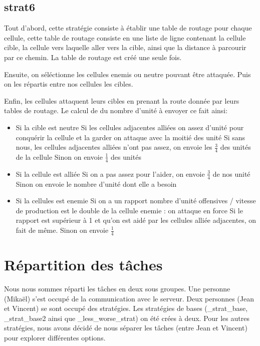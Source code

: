 \documentclass{rapport}
\begin{document}
		\section{strat6}
			Tout d'abord, cette stratégie consiste à établir une table de routage pour chaque cellule, cette table de routage consiste en une liste de ligne contenant la cellule cible, la cellule vers laquelle aller vers la cible, ainsi que la distance à parcourir par ce chemin. La table de routage est créé une seule fois.

			Ensuite, on séléctionne les cellules enemis ou neutre pouvant être attaquée. Puis on les répartis entre nos cellules les cibles.

			Enfin, les cellules attaquent leurs cibles en prenant la route donnée par leurs tables de routage.
			Le calcul de du nombre d'unité à envoyer ce fait ainsi:
			\begin{itemize}
					\item Si la cible est neutre
						\subitem Si les cellules adjacentes alliées on assez d'unité pour conquérir la cellule et la garder on attaque avec la moitié des unité
						\subitem Si sans nous, les cellules adjacentes alliées n'ont pas assez, on envoie les $\frac{3}{4}$ des unités de la cellule
						\subitem Sinon on envoie $\frac{1}{4}$ des unités
					\item Si la cellule est alliée
						\subitem Si on a pas assez pour l'aider, on envoie $\frac{3}{4}$ de nos unité
						\subitem Sinon on envoie le nombre d'unité dont elle a besoin
					\item Si la cellules est enemie
						\subitem Si on a un rapport nombre d'unité offensives / vitesse de production est le double de la cellule enemie : on attaque en force
						\subitem Si le rapport est supérieur à 1 et qu'on est aidé par les cellules alliée adjacentes, on fait de même.
						\subitem Sinon on envoie $\frac{1}{4}$
			\end{itemize}
	\chapter{Répartition des tâches}
		Nous nous sommes réparti les tâches en deux sous groupes. Une personne (Mikaël) s'est occupé de la communication
		avec le serveur. Deux personnes (Jean et Vincent) se sont occupé des stratégies. Les stratégies de bases (\_strat\_base, \_strat\_base2 ainsi que \_less\_worse\_strat) on été crées à deux. Pour les autres stratégies, nous avons décidé de nous séparer les tâches (entre Jean et Vincent) pour explorer différentes options.
\end{document}
